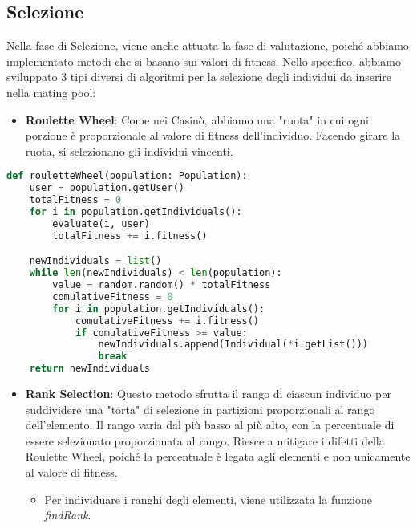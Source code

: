 \documentclass{article}
\begin{document}
\pagebreak

\subsection{Selezione}

Nella fase di Selezione, viene anche attuata la fase di valutazione, poiché abbiamo implementato metodi che si basano sui valori di fitness. Nello specifico, abbiamo sviluppato 3 tipi diversi di algoritmi per la selezione degli individui da inserire nella mating pool:

\begin{itemize}
\item\textbf{Roulette Wheel}: Come nei Casinò, abbiamo una "ruota" in cui ogni porzione è proporzionale al valore di fitness dell'individuo. Facendo girare la ruota, si selezionano gli individui vincenti.
\end{itemize}

\begin{lstlisting}[language=Python]
def rouletteWheel(population: Population):
    user = population.getUser()
    totalFitness = 0
    for i in population.getIndividuals():
        evaluate(i, user)
        totalFitness += i.fitness()

    newIndividuals = list()
    while len(newIndividuals) < len(population):
        value = random.random() * totalFitness
        comulativeFitness = 0
        for i in population.getIndividuals():
            comulativeFitness += i.fitness()
            if comulativeFitness >= value:
                newIndividuals.append(Individual(*i.getList()))
                break
    return newIndividuals
\end{lstlisting}

\begin{itemize}
\item\textbf{Rank Selection}: Questo metodo sfrutta il rango di ciascun individuo per suddividere una "torta" di selezione in partizioni proporzionali al rango dell'elemento. Il rango varia dal più basso al più alto, con la percentuale di essere selezionato proporzionata al rango. Riesce a mitigare i difetti della Roulette Wheel, poiché la percentuale è legata agli elementi e non unicamente al valore di fitness.
\begin{itemize}
    \item Per individuare i ranghi degli elementi, viene utilizzata la funzione \textit{findRank}.
\end{itemize}

\end{itemize}
\end{document}
